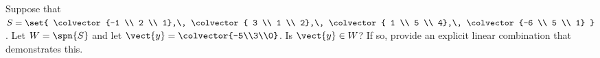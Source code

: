 Suppose that $S=\set{
\colvector{-1 \\ 2 \\ 1},\,
\colvector{ 3 \\ 1 \\ 2},\,
\colvector{ 1 \\ 5 \\ 4},\,
\colvector{-6 \\ 5 \\ 1}
}$. Let $W=\spn{S}$ and let $\vect{y}=\colvector{-5\\3\\0}$.  Is $\vect{y}\in W$?  If so, provide an explicit linear combination that demonstrates this.